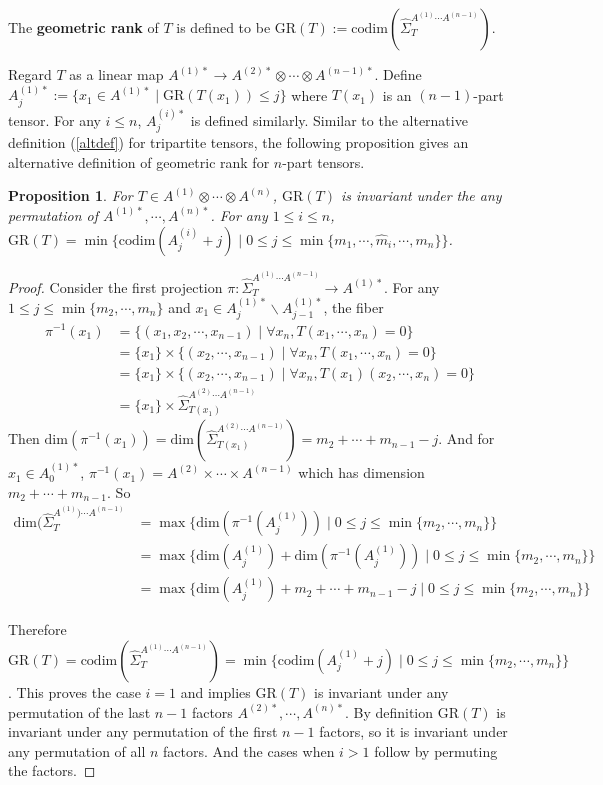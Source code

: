 \documentclass[10pt]{article} %
\newcommand{\GR}{\mathrm{GR}}
\newcommand{\ot}{\otimes}
\newtheorem{prop}[thm]{Proposition}
\theoremstyle{definition}
\begin{document}
The \textbf{geometric rank} of $T$ is defined to be $\mathrm{GR}(T):=\mathrm{codim} (\hat{\Sigma}_T^{A^{(1)}\cdots A^{(n-1)}})$.

Regard $T$ as a linear map $A^{(1)*}\rightarrow A^{(2)*}\ot\cdots\ot A^{(n-1)*}$. Define $A^{(1)*}_j:=\{x_1\in A^{(1)*}\mid  \mathrm{GR}(T(x_1))\leq j\}$ where $T(x_1)$ is an $(n-1)$-part tensor. For any $i\leq n$, $A^{(i)*}_j$ is defined similarly. Similar to the alternative definition (\ref{altdef}) for tripartite tensors, the following proposition gives an alternative definition of geometric rank for $n$-part tensors.

\begin{prop}\label{altdef2}
For $T\in A^{(1)}\otimes\cdots\otimes A^{(n)}$, $\GR(T)$ is invariant under the any permutation of $A^{(1)*},\cdots,A^{(n)*}$. For any $1\leq i\leq n$,  $\GR(T)=\min\{\mathrm{codim}(A^{(i)}_{j}+j)\mid 0\leq j\leq \min\{m_1,\cdots,\hat{m}_i,\cdots,m_n\}\}$.
\end{prop}

\begin{proof}
Consider the first projection $\pi:\hat{\Sigma}_T^{A^{(1)}\cdots A^{(n-1)}} \rightarrow A^{(1)*}$. For any $1\leq j\leq \min\{m_2,\cdots,m_n\}$ and $x_1\in A^{(1)*}_{j}\backslash A^{(1)*}_{j-1}$, the fiber 
\begin{align*}
    \pi^{-1}(x_1)&=\{(x_1,x_2,\cdots,x_{n-1})\mid \forall x_n, T(x_1,\cdots,x_n)=0\}\\
    &=\{x_1\}\times\{(x_2,\cdots,x_{n-1})\mid \forall x_n, T(x_1,\cdots,x_n)=0\} \\
    &=\{x_1\}\times\{(x_2,\cdots,x_{n-1})\mid \forall x_n, T(x_1)(x_2,\cdots,x_n)=0\}\\
    &=\{x_1\}\times\hat{\Sigma}_{T(x_1)}^{A^{(2)}\cdots A^{(n-1)}}
\end{align*}
Then $\mathrm{dim}(\pi^{-1}(x_1))=\mathrm{dim}(\hat{\Sigma}_{T(x_1)}^{A^{(2)}\cdots A^{(n-1)}})=m_2+\cdots+m_{n-1}-j$. And for $x_1\in A^{(1)*}_0$, $\pi^{-1}(x_1)=A^{(2)}\times\cdots\times A^{(n-1)}$ which has dimension $m_2+\cdots+m_{n-1}$. So
\begin{align*}
    \mathrm{dim}(\hat{\Sigma}_T^{A^{(1)})\cdots A^{(n-1)}}&=\max\{\mathrm{dim}(\pi^{-1}(A^{(1)}_{j}))\mid 0\leq j\leq \min\{m_2,\cdots,m_n\}\}\\
    &=\max\{\mathrm{dim}(A^{(1)}_{j})+\mathrm{dim}(\pi^{-1}(A^{(1)}_{j}))\mid 0\leq j\leq \min\{m_2,\cdots,m_n\}\}\\
    &=\max\{\mathrm{dim}(A^{(1)}_{j})+m_2+\cdots+m_{n-1}-j\mid 0\leq j\leq \min\{m_2,\cdots,m_n\}\}
\end{align*}

Therefore $\GR(T)=\mathrm{codim}(\hat{\Sigma}_T^{A^{(1)}\cdots A^{(n-1)}} )=\min\{\mathrm{codim}(A^{(1)}_{j}+j)\mid 0\leq j\leq \min\{m_2,\cdots,m_n\}\}$. This proves the case $i=1$ and implies $\GR(T)$ is invariant under any permutation of the last $n-1$ factors $A^{(2)*},\cdots,A^{(n)*}$. By definition $\GR(T)$ is invariant under any permutation of the first $n-1$ factors, so it is invariant under any permutation of all $n$ factors. And the cases when $i>1$ follow by permuting the factors.
\end{proof}
\end{document}
